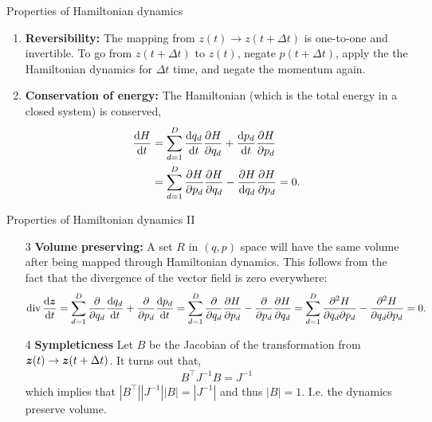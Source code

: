 \documentclass[aspectratio=169]{beamer}
\begin{document}
\begin{frame}{Properties of Hamiltonian dynamics}

\begin{enumerate}
    \item \textbf{Reversibility: } The mapping from $z(t) \to z(t+ \Delta t)$ is one-to-one and invertible. To go from $z(t + \Delta t)$ to $z(t)$, negate $p(t + \Delta t)$, apply the the Hamiltonian dynamics for $\Delta t$ time, and negate the momentum again.
    
    \item \textbf{Conservation of energy: } The Hamiltonian (which is the total energy in a closed system) is conserved,
    \begin{align}
        \frac{\mathop{}\!\mathrm{d} H}{\mathop{}\!\mathrm{d} t} &= \sum_{d=1}^D \frac{\mathop{}\!\mathrm{d} q_d}{\mathop{}\!\mathrm{d} t} \frac{\partial H}{\partial q_d} + \frac{\mathop{}\!\mathrm{d} p_d}{\mathop{}\!\mathrm{d} t} \frac{\partial H}{\partial p_d} \\
        &= \sum_{d=1}^D \frac{\partial H}{\partial p_d} \frac{\partial H}{\partial q_d} - \frac{\partial H}{\mathop{}\!\mathrm{d} q_d} \frac{\partial H}{\partial p_d} = 0.
    \end{align}
    
    
\end{enumerate}
    
\end{frame}

\begin{frame}[t]{Properties of Hamiltonian dynamics II}

\begin{enumerate}
    \item[3] \textbf{Volume preserving: } A set $R$ in $(q,p)$ space will have the same volume after being mapped through Hamiltonian dynamics. This follows from the fact that the divergence of the vector field is zero everywhere:
    \begin{align}
        \mathrm{div} \, \frac{\mathop{}\!\mathrm{d} \boldsymbol{z}}{\mathop{}\!\mathrm{d} t}
        = \sum_{d=1}^D \frac{\partial }{\partial q_d} \frac{\mathop{}\!\mathrm{d} q_d}{\mathop{}\!\mathrm{d} t} + \frac{\partial }{\partial p_d} \frac{\mathop{}\!\mathrm{d} p_d}{\mathop{}\!\mathrm{d} t}
        = \sum_{d=1}^D \frac{\partial }{\partial q_d} \frac{\partial H}{\partial p_d} - \frac{\partial }{\partial p_d} \frac{\partial H}{\partial q_d}
        = \sum_{d=1}^D \frac{\partial^2 H}{\partial q_d \partial p_d} - \frac{\partial^2 H}{\partial q_d \partial p_d} 
        = 0.
    \end{align}
    
    \item[4] \textbf{Sympleticness} Let $B$ be the Jacobian of the transformation from $\boldsymbol{z}(t) \to \boldsymbol{z}(t + \Delta t)$. It turns out that,
    \begin{align}
        B^\top J^{-1} B = J^{-1} 
    \end{align}
    which implies that $|B^\top| |J^{-1} | |B| = |J^{-1}|$ and thus $|B| = 1$. I.e. the dynamics preserve volume. 
\end{enumerate}
    
\end{frame}
\end{document}
